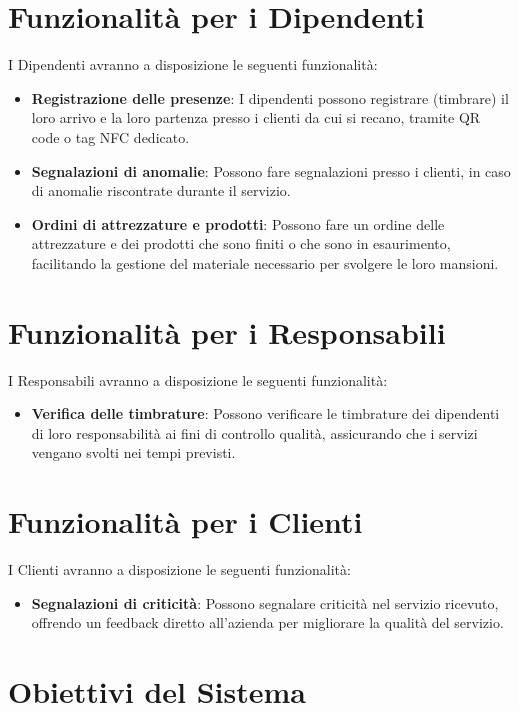 \documentclass[twoside]{supsistudent}
\begin{document}
\section{Funzionalità per i Dipendenti}

I Dipendenti avranno a disposizione le seguenti funzionalità:
\begin{itemize}
  \item \textbf{Registrazione delle presenze}: I dipendenti possono registrare (timbrare) il loro arrivo e la loro partenza presso i clienti da cui si recano, tramite QR code o tag NFC dedicato.
  \item \textbf{Segnalazioni di anomalie}: Possono fare segnalazioni presso i clienti, in caso di anomalie riscontrate durante il servizio.
  \item \textbf{Ordini di attrezzature e prodotti}: Possono fare un ordine delle attrezzature e dei prodotti che sono finiti o che sono in esaurimento, facilitando la gestione del materiale necessario per svolgere le loro mansioni.
\end{itemize}

\section{Funzionalità per i Responsabili}

I Responsabili avranno a disposizione le seguenti funzionalità:
\begin{itemize}
  \item \textbf{Verifica delle timbrature}: Possono verificare le timbrature dei dipendenti di loro responsabilità ai fini di controllo qualità, assicurando che i servizi vengano svolti nei tempi previsti.
\end{itemize}

\section{Funzionalità per i Clienti}

I Clienti avranno a disposizione le seguenti funzionalità:
\begin{itemize}
  \item \textbf{Segnalazioni di criticità}: Possono segnalare criticità nel servizio ricevuto, offrendo un feedback diretto all'azienda per migliorare la qualità del servizio.
\end{itemize}

\section{Obiettivi del Sistema}
\end{document}
